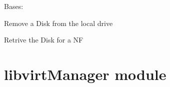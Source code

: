 \documentclass[letterpaper,10pt,oneside]{sphinxmanual}
\begin{document}
\begin{fulllineitems}
\label{diskManager:diskManager.DiskManager}
Bases: 

\begin{fulllineitems}
\label{diskManager:diskManager.DiskManager.removeLocalDisk}
Remove a Disk from the local drive

\end{fulllineitems}


\begin{fulllineitems}
\label{diskManager:diskManager.DiskManager.retriveDisk}
Retrive the Disk for a NF

\end{fulllineitems}


\end{fulllineitems}



\chapter{libvirtManager module}
\label{libvirtManager:module-libvirtManager}\label{libvirtManager:libvirtmanager-module}\label{libvirtManager::doc}
\end{document}

